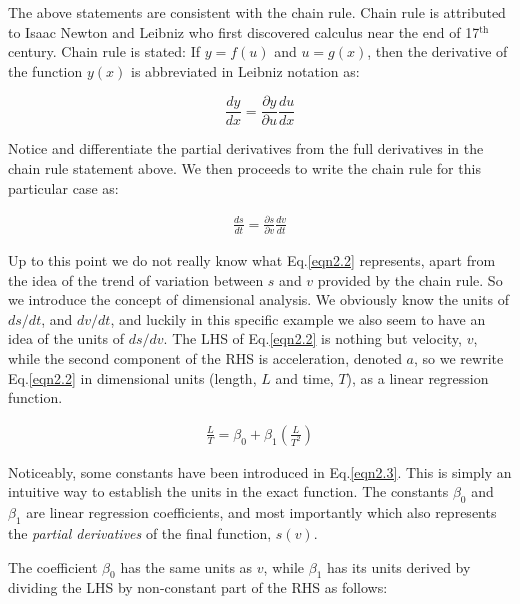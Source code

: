 \noindent The above statements are consistent with the chain rule. Chain rule is attributed to Isaac Newton and Leibniz who first discovered calculus near the end of 17$^\text{th}$ century. Chain rule is stated: If $y = f(u)$ and $u = g(x)$, then the derivative of the function $y(x)$ is abbreviated in Leibniz notation as:

\begin{equation}
\frac{dy}{dx} = \frac{\partial y}{\partial u}\frac{du}{dx}
\label{eqn2.102}
\end{equation}

\noindent Notice and differentiate the partial derivatives from the full derivatives in the chain rule statement above. We then proceeds to write the chain rule for this particular case as:

\begin{eqnarray}
\frac{ds}{dt} = \frac{\partial s}{\partial v}\frac{dv}{dt}
\label{eqn2.2}
\end{eqnarray}

\noindent Up to this point we do not really know what Eq.\eqref{eqn2.2} represents, apart from the idea of the trend of variation between $s$ and $v$ provided by the chain rule. So we introduce the concept of dimensional analysis. We obviously know the units of $ds/dt$, and $dv/dt$, and luckily in this specific example we also seem to have an idea of the units of $ds/dv$. The LHS of Eq.\eqref{eqn2.2} is nothing but velocity, $v$, while the second component of the RHS is acceleration, denoted $a$, so we rewrite Eq.\eqref{eqn2.2} in dimensional units (length, $L$ and time, $T$), as a linear regression function.

\begin{eqnarray}
\frac{L}{T} = \beta_0 + \beta_1\left( \frac{L}{T^2}\right) 
\label{eqn2.3}
\end{eqnarray}  

\noindent Noticeably, some constants have been introduced in Eq.\eqref{eqn2.3}. This is simply an intuitive way to establish the units in the exact function. The constants $\beta_0$ and $\beta_1$ are linear regression coefficients, and most importantly which also represents the \emph{partial derivatives} of the final function, $s\left(v\right)$. 

\noindent The coefficient $\beta_0$ has the same units as $v$, while $\beta_1$ has its units derived by dividing the LHS by non-constant part of the RHS as follows:

